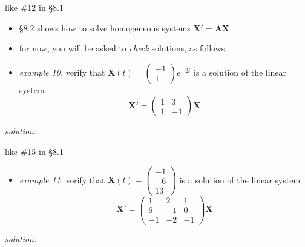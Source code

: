 \documentclass[dvipsnames,colorlinks]{beamer}
\newcommand{\bA}{\mathbf{A}}
\newcommand{\bX}{\mathbf{X}}
\begin{document}
\begin{frame}{like \#12 in \S8.1}

\begin{itemize}
\item \S8.2 shows how to solve homogeneous systems $\bX' = \bA \bX$
\item for now, you will be asked to \emph{check} solutions, as follows
\item \emph{example 10.}  verify that $\displaystyle \bX(t)=\begin{pmatrix} -1 \\ 1 \end{pmatrix} e^{-2t}$ is a solution of the linear system
    $$\bX' = \begin{pmatrix} 1 & 3 \\ 1 & -1 \end{pmatrix} \bX$$
\end{itemize}

\noindent \emph{solution.}

\vspace{35mm}
\end{frame}


\begin{frame}{like \#15 in \S8.1}

\begin{itemize}
\item \emph{example 11.}  verify that $\displaystyle \bX(t)=\begin{pmatrix} -1 \\ -6 \\ 13 \end{pmatrix}$ is a solution of the linear system
    $$\bX' = \begin{pmatrix} 1 & 2 & 1 \\ 6 & -1 & 0 \\ -1 & -2 & -1 \end{pmatrix} \bX$$
\end{itemize}

\noindent \emph{solution.}

\vspace{35mm}
\end{frame}
\end{document}
